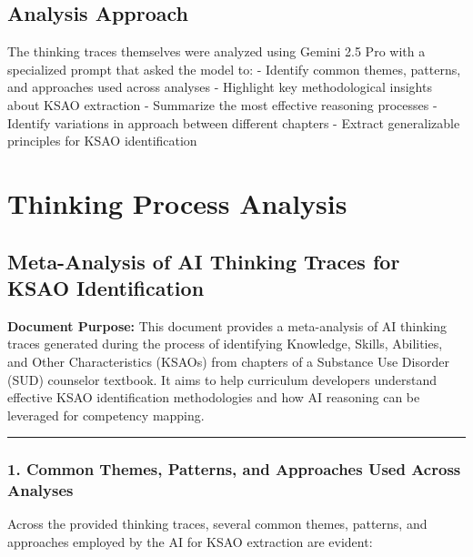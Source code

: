 \documentclass[
  letterpaper,
  DIV=11,
  numbers=noendperiod]{scrartcl}
\begin{document}
\subsection{Analysis Approach}\label{analysis-approach}

The thinking traces themselves were analyzed using Gemini 2.5 Pro with a
specialized prompt that asked the model to: - Identify common themes,
patterns, and approaches used across analyses - Highlight key
methodological insights about KSAO extraction - Summarize the most
effective reasoning processes - Identify variations in approach between
different chapters - Extract generalizable principles for KSAO
identification

\section{Thinking Process Analysis}\label{thinking-process-analysis}

\subsection{Meta-Analysis of AI Thinking Traces for KSAO
Identification}\label{meta-analysis-of-ai-thinking-traces-for-ksao-identification}

\textbf{Document Purpose:} This document provides a meta-analysis of AI
thinking traces generated during the process of identifying Knowledge,
Skills, Abilities, and Other Characteristics (KSAOs) from chapters of a
Substance Use Disorder (SUD) counselor textbook. It aims to help
curriculum developers understand effective KSAO identification
methodologies and how AI reasoning can be leveraged for competency
mapping.

\begin{center}\rule{0.5\linewidth}{0.5pt}\end{center}

\subsubsection{1. Common Themes, Patterns, and Approaches Used Across
Analyses}\label{common-themes-patterns-and-approaches-used-across-analyses}

Across the provided thinking traces, several common themes, patterns,
and approaches employed by the AI for KSAO extraction are evident:
\end{document}
